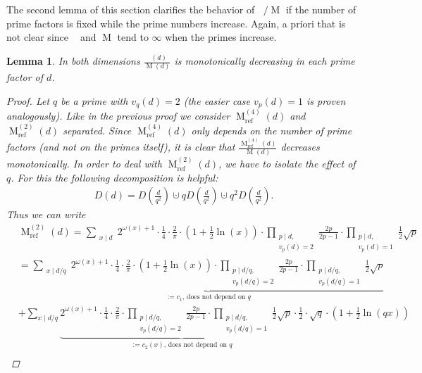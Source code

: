 \documentclass{amsart}
\newtheorem{lem}[thm]{Lemma}
\theoremstyle{definition}
\theoremstyle{remark}
\DeclareMathOperator{\M}{M}
\DeclareMathOperator{\Mref}{M_{ref}}
\begin{document}
The second lemma of this section clarifies the behavior of $\Mref / \M$ if the number of prime factors is fixed while the prime numbers increase.
Again, a priori that is not clear since $\Mref$ and $\M$ tend to $\infty$ when the primes increase.
\begin{lem}
 In both dimensions $\frac{\Mref(d)}{\M(d)}$ is monotonically decreasing in each prime factor of $d$.
 \begin{proof}
  Let $q$ be a prime with $v_q(d) = 2$ (the easier case $v_p(d) = 1$ is proven analogously). 
  Like in the previous proof we consider $\M^{(4)}_{\mathrm{ref}}(d)$ and $\M^{(2)}_{\mathrm{ref}}(d)$ separated.
  Since $\M^{(4)}_{\mathrm{ref}}(d)$ only depends on the number of prime factors (and not on the primes itself), 
  it is clear that $\frac{\M^{(4)}_{\mathrm{ref}}(d)}{\M(d)}$ decreases monotonically. In order to deal with $\M^{(2)}_{\mathrm{ref}}(d)$, we have to isolate the effect of $q$.
  For this the following decomposition is helpful:
  \begin{align*}
   D(d) = D(\tfrac{d}{q^2}) \cupdot q D(\tfrac{d}{q^2}) \cupdot q^2 D(\tfrac{d}{q^2}).
  \end{align*}
  Thus we can write
  \begin{align*}
  & \M^{(2)}_{\mathrm{ref}}(d)  = \sum_{\substack{x \mid d}} 2^{\omega(x)+1} \cdot \frac{1}{4} \cdot \frac{2}{\pi} 
     \cdot  \left(1+\frac{1}{2}\ln(x)\right)
     \cdot \prod_{\substack{p \mid d,\\v_p(d)=2}}\frac{2p}{2p-1} \cdot \prod_{\substack{p \mid d,\\v_p(d)=1}}\frac{1}{2}\sqrt{p} \\
   & =   \underbrace{\sum_{\substack{x \mid d/q}} 2^{\omega(x)+1} \cdot \frac{1}{4} \cdot \frac{2}{\pi} 
         \cdot  \left(1+\frac{1}{2}\ln(x)\right)
         \cdot \prod_{\substack{p \mid d/q,\\v_p(d/q)=2}}\frac{2p}{2p-1} \cdot \prod_{\substack{p \mid d/q,\\v_p(d/q)=1}}\frac{1}{2}\sqrt{p}}_{\text{$:=c_1$, does not depend on $q$}} \\
   & +   \sum_{x \mid d/q} \underbrace{2^{\omega(x)+1} \cdot \frac{1}{4} \cdot \frac{2}{\pi} 
         \cdot \prod_{\substack{p \mid d/q,\\v_p(d/q)=2}}\frac{2p}{2p-1} \cdot \prod_{\substack{p \mid d/q,\\v_p(d/q)=1}}\frac{1}{2}\sqrt{p} \cdot \frac{1}{2}}_{\text{$:=c_2(x)$, does not depend on $q$}}
         \cdot \sqrt{q} \cdot \left(1+\frac{1}{2}\ln(qx)\right)\\

\end{align*}
\end{proof}
\end{lem}
\end{document}
